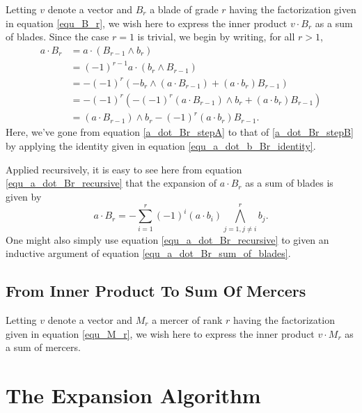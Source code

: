 \documentclass{birkjour}
\theoremstyle{definition}
\theoremstyle{remark}
\numberwithin{equation}{section}
\begin{document}
Letting $v$ denote a vector and $B_r$ a blade of grade $r$ having the factorization
given in equation \eqref{equ_B_r}, we wish here to express the inner product $v\cdot B_r$ as a sum of blades.
Since the case $r=1$ is trivial, we begin by writing, for all $r>1$,
\begin{align}
a\cdot B_r
 &= a\cdot(B_{r-1}\wedge b_r)\nonumber \\
 &= (-1)^{r-1}a\cdot(b_r\wedge B_{r-1})\label{a_dot_Br_stepA} \\
 &= -(-1)^r\left(-b_r\wedge(a\cdot B_{r-1})+(a\cdot b_r)B_{r-1}\right)\label{a_dot_Br_stepB} \\
 &= -(-1)^r\left(-(-1)^r(a\cdot B_{r-1})\wedge b_r+(a\cdot b_r)B_{r-1}\right)\nonumber \\
 &= (a\cdot B_{r-1})\wedge b_r - (-1)^r(a\cdot b_r)B_{r-1}.\label{equ_a_dot_Br_recursive}
\end{align}
Here, we've gone from equation \eqref{a_dot_Br_stepA} to that of \eqref{a_dot_Br_stepB} by
applying the identity given in equation \eqref{equ_a_dot_b_Br_identity}.

Applied recursively, it is easy to see here from equation \eqref{equ_a_dot_Br_recursive} that the expansion of
$a\cdot B_r$ as a sum of blades is given by
\begin{equation}\label{equ_a_dot_Br_sum_of_blades}
a\cdot B_r = -\sum_{i=1}^r(-1)^i(a\cdot b_i)\bigwedge_{j=1,j\neq i}^r b_j.
\end{equation}
One might also simply use equation \eqref{equ_a_dot_Br_recursive} to given an inductive
argument of equation \eqref{equ_a_dot_Br_sum_of_blades}.


\subsection{From Inner Product To Sum Of Mercers}

Letting $v$ denote a vector and $M_r$ a mercer of rank $r$ having the factorization
given in equation \eqref{equ_M_r},
we wish here to express the inner product $v\cdot M_r$ as a sum of mercers.

\section{The Expansion Algorithm}

\end{document}
